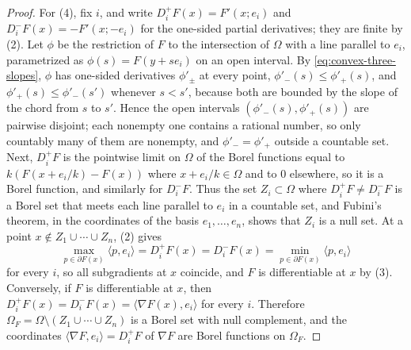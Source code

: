 \begin{proof}
For (4), fix $i$, and write $D_i^+F(x)=F'(x;e_i)$ and $D_i^-F(x)=-F'(x;-e_i)$ for the one-sided partial derivatives; they are finite by (2). Let $\phi$ be the restriction of $F$ to the intersection of $\Omega$ with a line parallel to $e_i$, parametrized as $\phi(s)=F(y+se_i)$ on an open interval. By \eqref{eq:convex-three-slopes}, $\phi$ has one-sided derivatives $\phi'_\pm$ at every point, $\phi'_-(s)\leq\phi'_+(s)$, and $\phi'_+(s)\leq\phi'_-(s')$ whenever $s<s'$, because both are bounded by the slope of the chord from $s$ to $s'$. Hence the open intervals $(\phi'_-(s),\phi'_+(s))$ are pairwise disjoint; each nonempty one contains a rational number, so only countably many of them are nonempty, and $\phi'_-=\phi'_+$ outside a countable set. Next, $D_i^+F$ is the pointwise limit on $\Omega$ of the Borel functions equal to $k(F(x+e_i/k)-F(x))$ where $x+e_i/k\in\Omega$ and to $0$ elsewhere, so it is a Borel function, and similarly for $D_i^-F$. Thus the set $Z_i\subset\Omega$ where $D_i^+F\neq D_i^-F$ is a Borel set that meets each line parallel to $e_i$ in a countable set, and Fubini's theorem, in the coordinates of the basis $e_1,\ldots,e_n$, shows that $Z_i$ is a null set. At a point $x\notin Z_1\cup\cdots\cup Z_n$, (2) gives
\[
 \max_{p\in\partial F(x)}\langle p,e_i\rangle=D_i^+F(x)=D_i^-F(x)=\min_{p\in\partial F(x)}\langle p,e_i\rangle
\]
for every $i$, so all subgradients at $x$ coincide, and $F$ is differentiable at $x$ by (3). Conversely, if $F$ is differentiable at $x$, then $D_i^+F(x)=D_i^-F(x)=\langle\nabla F(x),e_i\rangle$ for every $i$. Therefore $\Omega_F=\Omega\setminus(Z_1\cup\cdots\cup Z_n)$ is a Borel set with null complement, and the coordinates $\langle\nabla F,e_i\rangle=D_i^+F$ of $\nabla F$ are Borel functions on $\Omega_F$.
\end{proof}

